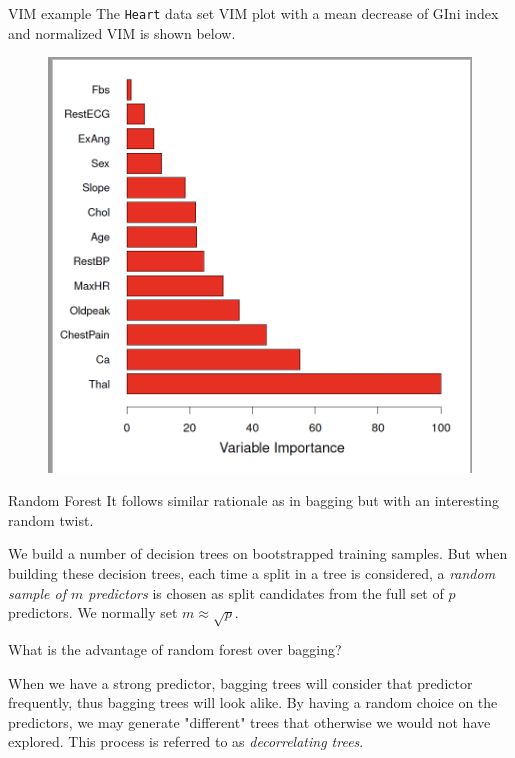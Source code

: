 \documentclass{beamer}
\begin{document}
	\begin{frame}{VIM example}
		The {\tt Heart} data set VIM plot with a mean decrease of GIni index and normalized VIM is shown below.
		\begin{figure}[h]
			\centering
			\includegraphics[scale=0.35]{../../Figures/fig_vim.png}
		\end{figure}
		
	\end{frame}
	
	\begin{frame}{Random Forest}
		It follows similar rationale as in bagging but with an interesting random twist.
		
		We build a number of decision trees on bootstrapped training samples. But when building these decision trees, each time a split in a tree is considered, a {\it random sample of $m$ predictors} is chosen as split candidates from the full set of $p$ predictors.  We normally set $m\approx \sqrt{p}$.
		
		What is the advantage of random forest over bagging?
		
		When we have a strong predictor, bagging trees will consider that predictor frequently, thus bagging trees will look alike. By having a random choice on the predictors, we may generate "different" trees that otherwise we would not have explored. This process is referred to as {\it decorrelating trees}. 
		
	\end{frame}
	
\end{document}
